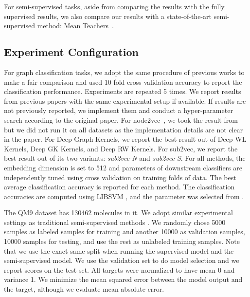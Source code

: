 \documentclass{article} \usepackage{iclr2020_conference,times}
\begin{document}
For semi-supervised tasks, aside from comparing the results with the fully supervised results, we also compare our results with a state-of-the-art semi-supervised method: Mean Teachers~\cite{tarvainen2017mean}.

\subsection{Experiment Configuration}
For graph classification tasks, we adopt the same procedure of previous works \cite{niepert2016learning,verma2017hunt,yanardag2015deep,zhang2018end} to make a fair comparison and used 10-fold cross validation accuracy to report the classification performance. Experiments are repeated 5 times. We report results from previous papers with the same experimental setup if available. If results are not previously reported, we implement them and conduct a hyper-parameter search according to the original paper. For node2vec~\cite{node2vec}, we took the result from \cite{narayanan2017graph2vec} but we did not run it on all datasets as the implementation details are not clear in the paper. For Deep Graph Kernels, we report the best result out of Deep WL Kernels, Deep GK Kernels, and Deep RW Kernels. For sub2vec, we report the best result out of its two variants: \textit{sub2vec-N} and \textit{sub2vec-S}. For all methods, the embedding dimension is set to 512 and parameters of downstream classifiers are independently tuned using cross validation on training folds of data. The best average classification accuracy is reported for each method. The classification accuracies are computed using \textsc{LIBSVM} \cite{chang2011libsvm}, and the  parameter was selected from  .



The QM9 dataset has 130462 molecules in it. We adopt similar experimental settings as traditional semi-supervised methods \cite{tarvainen2017mean,laine2016temporal,miyato2018virtual}. We randomly chose 5000 samples as labeled samples for training and another 10000 as validation samples, 10000 samples for testing, and use the rest as unlabeled training samples. Note that we use the exact same split when running the supervised model and the semi-supervised model. We use the validation set to do model selection and we report scores on the test set. All targets were normalized to have mean 0 and variance 1. We minimize the mean squared error between the model output and the target, although we evaluate mean absolute error.
\end{document}
